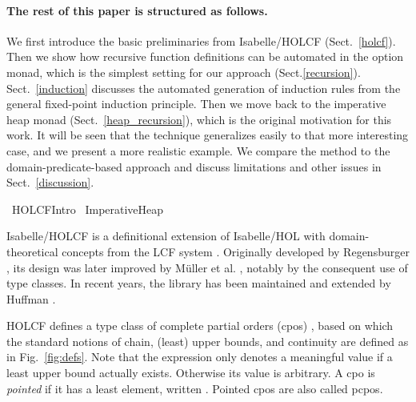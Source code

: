 \documentclass[copyright,creativecommons,sharealike]{eptcs}
\theoremstyle{remark}
\begin{document}
\begin{isabellebody}
\begin{isamarkuptext}
\paragraph{The rest of this paper is structured as follows.}
We first introduce the basic preliminaries from Isabelle/HOLCF (Sect.~\ref{holcf}).
Then we show how recursive function definitions can be
automated in the option monad, which is the simplest setting for our
approach (Sect.\ref{recursion}). Sect.~\ref{induction} discusses the automated generation of
induction rules from the general fixed-point induction principle.
Then we move back to the imperative heap monad (Sect.~\ref{heap_recursion}), which is the original
motivation for this work. It will be seen that the technique
generalizes easily to that more interesting case, and we present
a more realistic example.
We compare the method to the domain-predicate-based approach and discuss limitations
and other issues in Sect.~\ref{discussion}.\end{isamarkuptext}\isamarkuptrue \isadelimtheory
\endisadelimtheory
\isatagtheory
{}\isamarkupfalse \endisatagtheory
{\isafoldtheory}\isadelimtheory
\endisadelimtheory
\end{isabellebody} \begin{isabellebody}\def\isabellecontext{HOLCF{\isacharunderscore}Intro}\isadelimtheory
\endisadelimtheory
\isatagtheory
{}\isamarkupfalse \ HOLCF{\isacharunderscore}Intro\isanewline
{}\ Imperative{\isacharunderscore}Heap\isanewline
{}\endisatagtheory
{\isafoldtheory}\isadelimtheory
\endisadelimtheory
{}
\isamarkuptrue \label{holcf}
\isadelimproof
\endisadelimproof
\isatagproof
\endisatagproof
{\isafoldproof}\isadelimproof
\endisadelimproof
\begin{isamarkuptext}Isabelle/HOLCF is a definitional extension of Isabelle/HOL with
  domain-theoretical concepts from the LCF system \cite{Gordon79LCF}. Originally
  developed by Regensburger \cite{Regensburger95,Regensburger_phd},
  its design was later improved by M\"uller et al. \cite{holcf},
  notably by the consequent use of type classes. In recent years, the
  library has been maintained and extended by Huffman
  \cite{Huffman2008,Huffman2009}.

  HOLCF defines a type class of complete partial orders (cpos) \isa{{\isasymsqsubseteq}}, based on which the standard notions of chain, (least) upper
  bounds, and continuity are defined as in Fig.~\ref{fig:defs}.
  Note that the expression  only denotes a meaningful
  value if a least upper bound actually exists. Otherwise its value is
  arbitrary. A cpo is \emph{pointed} if it has a least element,
  written \isa{{\isasymbottom}}. Pointed cpos are also called pcpos.


\end{isamarkuptext}
\end{isabellebody}
\end{document}
